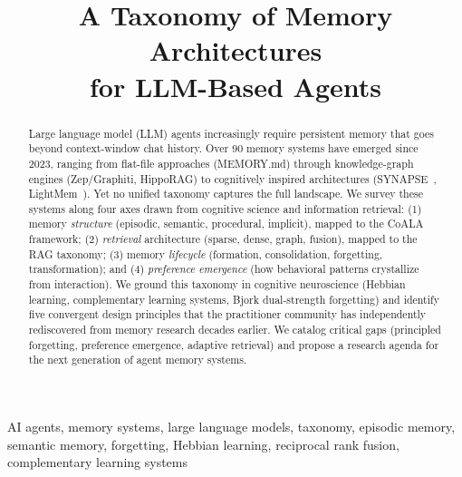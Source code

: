 \documentclass[conference]{IEEEtran}
\begin{document}
\title{A Taxonomy of Memory Architectures\\for LLM-Based Agents}

\author{
}

\maketitle
\pagestyle{plain}

\begin{abstract}
Large language model (LLM) agents increasingly require persistent memory
that goes beyond context-window chat history. Over 90 memory systems have
emerged since 2023, ranging from flat-file approaches (MEMORY.md) through
knowledge-graph engines (Zep/Graphiti, HippoRAG) to cognitively inspired
architectures (SYNAPSE~\cite{jiang2026synapse}, LightMem~\cite{fang2025lightmem}). Yet no unified taxonomy captures the full
landscape. We survey these systems along four axes drawn from cognitive
science and information retrieval: (1) memory \emph{structure} (episodic,
semantic, procedural, implicit), mapped to the CoALA framework; (2)
\emph{retrieval} architecture (sparse, dense, graph, fusion), mapped to
the RAG taxonomy; (3) memory \emph{lifecycle} (formation, consolidation,
forgetting, transformation); and (4) \emph{preference emergence} (how
behavioral patterns crystallize from interaction). We ground this taxonomy
in cognitive neuroscience (Hebbian learning, complementary learning
systems, Bjork dual-strength forgetting) and identify five convergent
design principles that the practitioner community has independently
rediscovered from memory research decades earlier. We catalog critical
gaps (principled forgetting, preference emergence, adaptive retrieval)
and propose a research agenda for the next generation of agent memory
systems.
\end{abstract}

\begin{IEEEkeywords}
AI agents, memory systems, large language models, taxonomy, episodic
memory, semantic memory, forgetting, Hebbian learning, reciprocal rank
fusion, complementary learning systems
\end{IEEEkeywords}












\def\UrlBreaks{\do\/\do-\do.\do=\do_\do?\do&\do\%\do\#\do\~}


\end{document}
